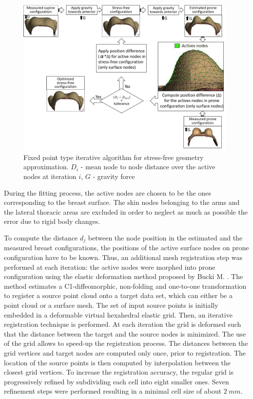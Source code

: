 \begin{figure}[!h]
\centering
\includegraphics[width=0.98\textwidth,keepaspectratio]{figures/stress_free_config_algo.jpg} 
\caption{Fixed point type iterative algorithm for stress-free geometry approximation. $D_i$ - mean node to node distance over the active nodes at iteration $i$, $G$ - gravity force}\label{fig:myfixedpointalgo}
\end{figure}

During the fitting process, the active nodes are chosen to be the ones corresponding to the breast surface. The skin nodes belonging to the  arms and the lateral thoracic areas are excluded  in order to neglect as much as possible the error due to rigid body changes.

To compute the distance $d_j$ between the node position in the estimated and the measured breast configurations, the  positions of the active surface nodes on prone configuration have to be known. Thus, an additional mesh registration step was performed at each iteration: the active nodes were morphed into prone configuration using the elastic deformation method proposed by Bucki M. \citep{bucki_fast_2010}. The method estimates a C1-diffeomorphic, non-folding and one-to-one transformation to register a source point cloud onto a target data set, which can either be a point cloud or a surface mesh.  The set of input source points is initially embedded in a deformable virtual hexahedral elastic grid. Then, an iterative registration technique is performed. At each iteration the grid is deformed such that the distance between the target and the source nodes is minimized. The use of the grid allows to speed-up the registration process. The distances between the grid vertices and target nodes are computed only once, prior to registration. The location of the source points is then computed by interpolation between the closest grid vertices. To increase the registration accuracy, the regular grid is progressively refined by subdividing each cell into eight smaller ones. Seven refinement steps were performed resulting in a minimal cell size of about $2\ mm$. 

